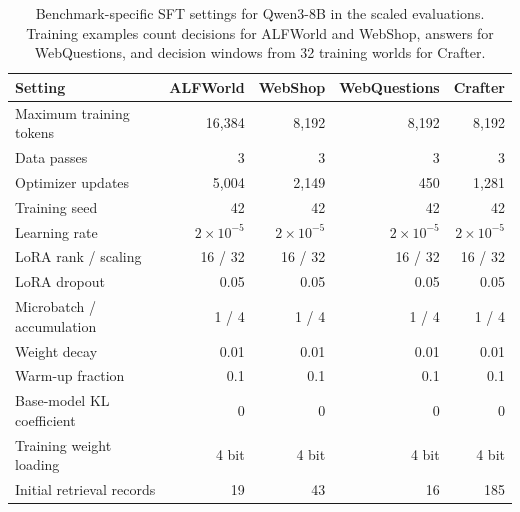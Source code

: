 \begin{table}[t]
\centering\footnotesize\setlength{\tabcolsep}{4pt}
\caption{Benchmark-specific SFT settings for Qwen3-8B in the scaled evaluations. Training examples count decisions for ALFWorld and WebShop, answers for WebQuestions, and decision windows from 32 training worlds for Crafter.}
\label{tab:qwen-hyperparameters}
\begin{tabular}{@{}lrrrr@{}}
\toprule
Setting & ALFWorld & WebShop & WebQuestions & Crafter\\
\midrule
Maximum training tokens & 16,384 & 8,192 & 8,192 & 8,192\\
Data passes & 3 & 3 & 3 & 3\\
Optimizer updates & 5,004 & 2,149 & 450 & 1,281\\
Training seed & 42 & 42 & 42 & 42\\
Learning rate & $2\times10^{-5}$ & $2\times10^{-5}$ & $2\times10^{-5}$ & $2\times10^{-5}$\\
LoRA rank / scaling & 16 / 32 & 16 / 32 & 16 / 32 & 16 / 32\\
LoRA dropout & 0.05 & 0.05 & 0.05 & 0.05\\
Microbatch / accumulation & 1 / 4 & 1 / 4 & 1 / 4 & 1 / 4\\
Weight decay & 0.01 & 0.01 & 0.01 & 0.01\\
Warm-up fraction & 0.1 & 0.1 & 0.1 & 0.1\\
Base-model KL coefficient & 0 & 0 & 0 & 0\\
Training weight loading & 4 bit & 4 bit & 4 bit & 4 bit\\
Initial retrieval records & 19 & 43 & 16 & 185\\
\bottomrule
\end{tabular}
\end{table}
